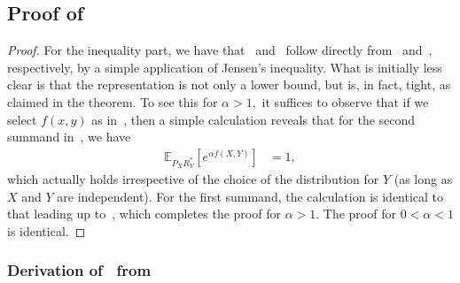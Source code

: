 \documentclass{article}
\numberwithin{theorem}{section}
\numberwithin{example}{section}
\numberwithin{remark}{section}
\numberwithin{definition}{section}
\newcommand{\E}{\mathbb{E}}
\begin{document}
\subsection{Proof of~}\label{app:variational:thm-Sibson-var-alternative-weaker}


\begin{proof}
For the inequality part, we have that~ and~ follow directly from~ and~, respectively, by a simple application of Jensen's inequality.
What is initially less clear is that the representation is not only a lower bound, but is, in fact, tight, as claimed in the theorem.
To see this for $\alpha>1,$ it suffices to observe that if we select $f(x,y)$ as in~, then a simple calculation reveals that for the second summand in~, we have
\begin{align}
  \E_{P_XR^*_Y}\left[e^{\alpha f(X,Y)}\right] &=1,
\end{align}
which actually holds irrespective of the choice of the distribution for $Y$ (as long as $X$ and $Y$ are independent). For the first summand, the calculation is identical to that leading up to~, which completes the proof for $\alpha>1.$
The proof for $0<\alpha<1$ is identical.
\end{proof}

\subsubsection{Derivation of~ from~}\label{app:variational:thm-Sibson-var-alternative-weaker-connection-to-VarReprSibs}
\end{document}
